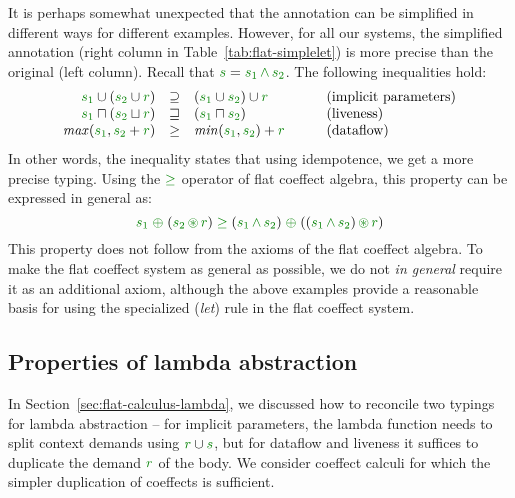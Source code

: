 It is perhaps somewhat unexpected that the annotation can be simplified in different ways for
different examples. However, for all our systems, the simplified annotation (right column in
Table~\ref{tab:flat-simplelet}) is more precise than the original (left column). Recall that
$\cclrd{s} = \cclrd{s_1}\,\czip\,\cclrd{s_2}$. The following inequalities hold:
%
\begin{equation*}
\begin{array}{rclll}
\cclrd{s_1} \cup (\cclrd{s_2} \cup \cclrd{r}) &\supseteq& (\cclrd{s_1} \cup \cclrd{s_2}) \cup \cclrd{r}
  && \textnormal{(implicit parameters)}\\
\cclrd{s_1} \sqcap (\cclrd{s_2} \sqcup \cclrd{r}) &\sqsupseteq&  (\cclrd{s_1} \sqcap \cclrd{s_2})
  && \textnormal{(liveness)} \\
\mathit{max}(\cclrd{s_1}, \cclrd{s_2} + \cclrd{r}) &\geq& \mathit{min}(\cclrd{s_1}, \cclrd{s_2}) + \cclrd{r}
  &\quad& \textnormal{(dataflow)} \\
\end{array}
\end{equation*}
%
In other words, the inequality states that using idempotence, we get a more precise typing.
Using the $\cgeq$ operator of flat coeffect algebra, this property can be expressed in general as:
%
\begin{equation*}
\cclrd{s_1} \;\cpar\; (\cclrd{s_2} \,\cseq\, \cclrd{r}) \;\cgeq\;
  (\cclrd{s_1} \,\czip\, \cclrd{s_2}) \;\cpar\; ((\cclrd{s_1} \,\czip\, \cclrd{s_2}) \,\cseq\, \cclrd{r})
\end{equation*}
%
This property does not follow from the axioms of the flat coeffect algebra. To make
the flat coeffect system as general as possible, we do not \emph{in general} require it as
an additional axiom, although the above examples provide a reasonable basis for using
the specialized (\emph{let}) rule in the flat coeffect system.


\subsection{Properties of lambda abstraction}
\label{sec:flat-exts-lambda}

In Section~\ref{sec:flat-calculus-lambda}, we discussed how to reconcile two typings for
lambda abstraction -- for implicit parameters, the lambda function needs to split context
demands using $\cclrd{r} \cup \cclrd{s}$, but for dataflow and liveness it suffices to
duplicate the demand $\cclrd{r}$ of the body. We consider coeffect calculi for which the
simpler duplication of coeffects is sufficient.

